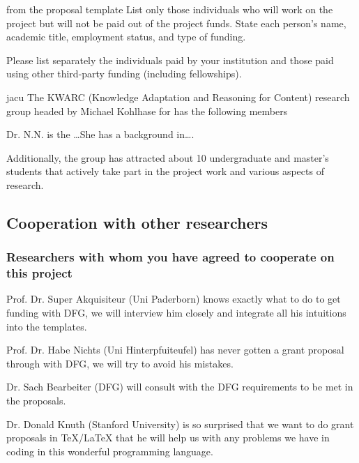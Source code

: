 \begin{todo}{from the proposal template}
List only those individuals who will work on the project but will not be paid out of the
project funds. State each person’s name, academic title, employment status, and type
of funding.

Please list separately the individuals paid by your institution and those paid using other
third-party funding (including fellowships).
\end{todo}
\begin{sitedescription}{jacu}
The KWARC (Knowledge Adaptation and Reasoning for Content) research group headed by
Michael Kohlhase for has the following members
\begin{compactdesc}
\item[Dr. N.N.] is the \ldots She has a background in\ldots.
\end{compactdesc}
Additionally, the group has attracted about 10 undergraduate and master's students that
actively take part in the project work and various aspects of research.
\end{sitedescription}


\subsection{Cooperation with other researchers }

\subsubsection{Researchers with whom you have agreed to cooperate on this project }

\begin{compactdesc}
\item[Prof. Dr. Super Akquisiteur (Uni Paderborn)] knows exactly what to do to get funding
  with DFG, we will interview him closely and integrate all his intuitions into the
  {\pn} templates.
\item[Prof. Dr. Habe Nichts (Uni Hinterpfuiteufel)] has never gotten a grant proposal
  through with DFG, we will try to avoid his mistakes.
\item[Dr. Sach Bearbeiter (DFG)] will consult with the DFG requirements to be met in the
  proposals.
\item[Dr. Donald Knuth (Stanford University)] is so surprised that we want to do grant
  proposals in {\TeX/\LaTeX} that he will help us with any problems we have in coding in
  this wonderful programming language.
\end{compactdesc}

